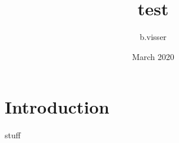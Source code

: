 \documentclass{article}
\title{test}
\author{b.visser }
\date{March 2020}
\begin{document}
\maketitle

\section{Introduction}
stuff
\end{document}
